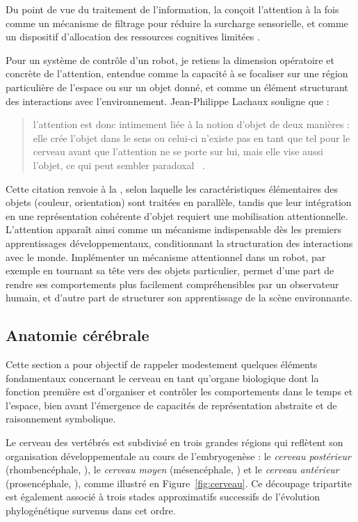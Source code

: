 Du point de vue du traitement de l'information, la  conçoit l'attention à la fois comme un mécanisme de filtrage pour réduire la surcharge sensorielle, et comme un dispositif d'allocation des ressources cognitives limitées \cite{murphy_twenty_2016}. 
 

Pour un système de contrôle d'un robot, je retiens la dimension opératoire et concrète de l'attention, entendue comme la capacité à se focaliser sur une région particulière de l'espace ou sur un objet donné, et comme un élément structurant des interactions avec l'environnement. 
Jean-Philippe Lachaux souligne que :
\begin{quote}
	\og l'attention est donc intimement liée à la notion d'objet de deux manières : elle crée l'objet dans le sens ou celui-ci n'existe pas en tant que tel pour le cerveau avant que l'attention ne se porte sur lui, mais elle vise aussi l'objet, ce qui peut sembler paradoxal \fg\
	\cite[p.~91]{lachaux_cerveau_2013}.
\end{quote}

Cette citation renvoie à la  \cite{treisman_feature-integration_1980}, selon laquelle les caractéristiques élémentaires des objets (couleur, orientation)  sont traitées en parallèle, tandis que leur intégration en une représentation cohérente d’objet requiert une mobilisation attentionnelle. 
L’attention apparaît ainsi comme un mécanisme indispensable dès les premiers apprentissages développementaux, conditionnant la structuration des interactions avec le monde.
Implémenter un mécanisme attentionnel dans un robot, par exemple en tournant sa tête vers des objets particulier,  permet d'une part de rendre ses comportements plus facilement compréhensibles par un observateur humain, et d'autre part de structurer son apprentissage de la scène environnante.

\subsection{Anatomie cérébrale}
\label{sec:anatomie}

\noindent
Cette section a pour objectif de rappeler modestement quelques éléments fondamentaux concernant le cerveau en tant qu’organe biologique dont la fonction première est d’organiser et contrôler les comportements dans le temps et l’espace, bien avant l’émergence de capacités de représentation abstraite et de raisonnement symbolique.

Le cerveau des vertébrés est subdivisé en trois grandes régions qui reflètent son organisation développementale au cours de l'embryogenèse : le \emph{cerveau postérieur} (rhombencéphale, ), le \emph{cerveau moyen} (mésencéphale, ) et le \emph{cerveau antérieur} (prosencéphale, ), comme illustré en Figure~\ref{fig:cerveau}.
Ce découpage tripartite est également associé à trois stades approximatifs successifs de l’évolution phylogénétique survenus dans cet ordre. 

